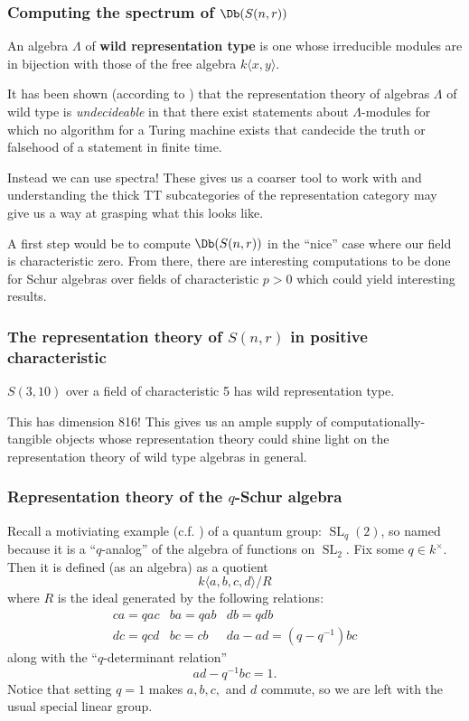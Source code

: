 \documentclass[12pt]{article}
\begin{document}
		\subsubsection{Computing the spectrum of \texorpdfstring{$\Db(S(n,r))$}{DbS(n,r)}}
		\begin{defn}
			An algebra $\Lambda$ of \textbf{wild representation type} is one whose irreducible 
			modules are in bijection with those of the free algebra $k\langle x,y\rangle$.
		\end{defn}
		\begin{thm} 
			It has been shown (according to \cite{bensonI}) that the representation theory of 
			algebras $\Lambda$ of wild type is \textit{undecideable} in that there exist statements about $\Lambda$-modules for which no algorithm for a Turing machine exists
			that candecide the truth or falsehood of a statement in finite time.
		\end{thm} 

		Instead we can use spectra! These gives us a coarser tool to work with and understanding the thick TT subcategories of 
		the representation category may give us a way at grasping what this looks like.

		A first step would be to compute $\Db(S(n,r))$ in the ``nice'' case where our field is characteristic zero. From there, there are interesting computations to be done 
		for Schur algebras over fields of characteristic $p>0$ which could yield interesting results.

		\subsubsection{The representation theory of \texorpdfstring{$S(n,r)$}{S(n,r)} in positive characteristic}
		\begin{thm}
			$S(3,10)$ over a field of characteristic 5 has wild representation type.
		\end{thm}

		This has dimension 816! This gives us an ample supply of computationally-tangible objects whose representation theory 
		could shine light on the representation theory of wild type algebras in general.

		\subsubsection{Representation theory of the \texorpdfstring{$q$}{q}-Schur algebra}
		Recall a motiviating example (c.f. \cite{majid}) of a quantum group: $\operatorname{SL}_q(2)$, so named because it is a ``$q$-analog'' of the algebra of functions on
		$\operatorname{SL}_2$. Fix some $q\in k^\times$. Then it is defined (as an algebra) as a quotient 
		\[k\langle a,b,c,d\rangle/R\]
		where $R$ is the ideal generated by the following relations:
		\[\begin{array}{ccc}
			ca=qac & ba=qab & db=qdb\\
			dc=qcd & bc=cb & da-ad=(q-q^{-1})bc
		\end{array}\]
		along with the ``$q$-determinant relation''
		\[ad-q^{-1}bc=1.\]
		Notice that setting $q=1$ makes $a,b,c,$ and $d$ commute, so we are left with the usual special linear group.
\end{document}
